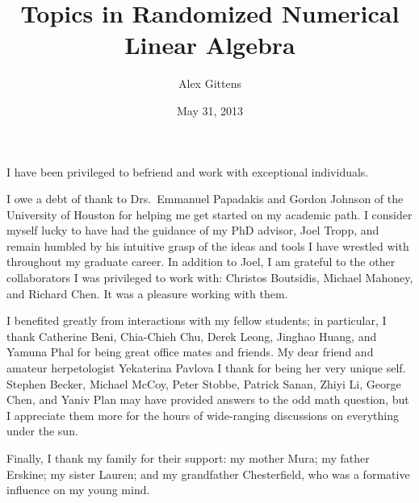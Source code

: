 \documentclass[singlespace,11pt,defended]{cit_thesis} %
\title{Topics in Randomized Numerical Linear Algebra}
\author{Alex Gittens}
\date{May 31, 2013}
\numberwithin{equation}{section}
\begin{document}
\maketitle
\begin{acknowledgements}
I have been privileged to befriend and work
with exceptional individuals.

I owe a debt of thank to Drs.~Emmanuel Papadakis and Gordon Johnson of the University of Houston
for helping me get started on my academic path.
I consider myself lucky to have had the guidance of my PhD advisor, Joel Tropp,
and remain humbled by his intuitive grasp of the ideas and tools I have wrestled with 
throughout my graduate career. In addition to Joel, I am grateful to the other collaborators I was privileged to
work with: Christos Boutsidis, Michael Mahoney, and Richard Chen. It
was a pleasure working with them.

I benefited greatly from interactions with my fellow students; in
particular, I thank Catherine Beni, Chia-Chieh Chu, Derek Leong, Jinghao Huang, and Yamuna Phal for
being great office mates and friends. My dear friend and
amateur herpetologist Yekaterina Pavlova I thank for being her very unique self.
Stephen Becker, Michael McCoy, Peter
Stobbe, Patrick Sanan, Zhiyi Li, George Chen, and Yaniv Plan may have provided answers to the odd 
math question, but I appreciate them more for the hours of wide-ranging discussions on
everything under the sun.

Finally, I thank my family for their support: my mother Mura; my father Erskine; my sister Lauren; 
and my grandfather Chesterfield, who was a formative influence on my young mind.
\end{acknowledgements}
\end{document}
